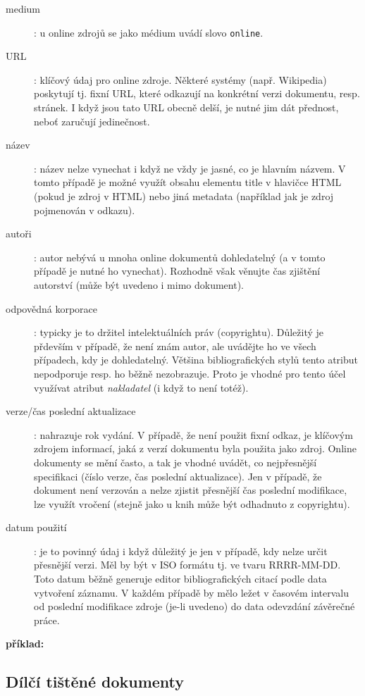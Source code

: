 \documentclass[male,czech,api_bc]{kitheses}
\begin{document}
\begin{description}
\item[medium]: u online zdrojů se jako médium uvádí slovo \texttt{online}.
\item[URL]: klíčový údaj pro online zdroje. Některé systémy (např. Wikipedia) poskytují tj. fixní URL, které odkazují na konkrétní verzi dokumentu, resp. stránek. I když jsou tato URL obecně delší, je nutné jim dát přednost, neboť zaručují jedinečnost.
\item[název]: název nelze vynechat i když ne vždy je jasné, co je hlavním názvem. V tomto případě je možné využít obsahu elementu title v hlavičce HTML (pokud je zdroj v HTML) nebo jiná metadata (například jak je zdroj pojmenován v odkazu).
\item[autoři]: autor nebývá u mnoha online dokumentů dohledatelný (a v tomto případě je nutné ho vynechat). Rozhodně však věnujte čas zjištění autorství (může být uvedeno i mimo dokument). 
\item[odpovědná korporace]: typicky je to držitel intelektuálních práv (copyrightu). Důležitý je přdevším v případě, že není znám autor, ale uvádějte ho ve všech případech, kdy je dohledatelný. Většina bibliografických stylů tento atribut nepodporuje resp. ho běžně nezobrazuje. Proto je vhodné pro tento účel využívat atribut \textit{nakladatel} (i když to není totéž).
\item[verze/čas poslední aktualizace]: nahrazuje rok vydání. V případě, že není použit fixní odkaz, je klíčovým zdrojem informací, jaká z verzí dokumentu byla použita jako zdroj. Online dokumenty se mění často, a tak je vhodné uvádět, co nejpřesnější specifikaci (číslo verze, čas poslední aktualizace). Jen v případě, že dokument není verzován a nelze zjistit přesnější čas poslední modifikace, lze využít vročení (stejně jako u knih může být odhadnuto z copyrightu).
\item[datum použití]: je to povinný údaj i když důležitý je jen v případě, kdy nelze určit přesnější verzi. Měl by být v ISO formátu tj. ve tvaru RRRR-MM-DD. Toto datum běžně generuje editor bibliografických citací podle data vytvoření záznamu. V každém případě by mělo ležet v časovém intervalu od poslední modifikace zdroje (je-li uvedeno) do data odevzdání závěrečné práce. 
\end{description}

\textbf{příklad:}

\subsection{Dílčí tištěné dokumenty}
\end{document}
